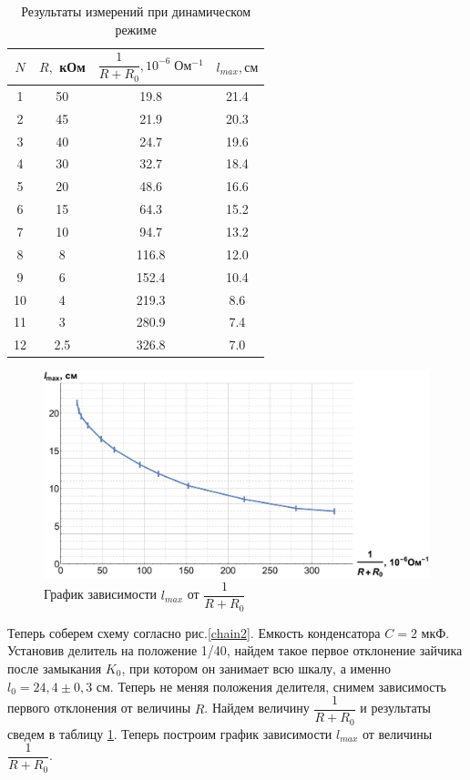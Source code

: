 \documentclass[12pt]{kiarticle} %
\begin{document}
 \begin{table}[h]
	\centering
	\caption{Результаты измерений при динамическом режиме}
	\begin{tabular}{|c|c|c|c|}
		\hline
	$ N $ & $ R, $ кОм & $ \dfrac{1}{R+R_0}, 10^{-6}\; Ом^{-1} $& $ l_{max}, см $ \\
		\hline
		1 & 50 & 19.8 & 21.4 \\
		2 & 45 & 21.9 & 20.3 \\
		3 & 40 & 24.7 & 19.6 \\
		4 & 30 & 32.7 & 18.4 \\
		5 & 20 & 48.6 & 16.6 \\
		6 & 15 & 64.3 & 15.2 \\
		7 & 10 & 94.7 & 13.2 \\
		8 & 8 & 116.8 & 12.0 \\
		9 & 6 & 152.4 & 10.4 \\
		10 & 4 & 219.3 & 8.6 \\
		11 & 3 & 280.9 & 7.4 \\
		12 & 2.5 & 326.8 & 7.0  \\
		\hline
	\end{tabular}%
	\label{resL}%
\end{table}%

	 \begin{figure}[h!]
	\includegraphics[scale=0.5]{L.pdf}
	\caption{График зависимости $ l_{max} $ от $ \dfrac{1}{R + R_0} $}
\end{figure}

Теперь соберем схему согласно рис.\ref{chain2}. Емкость конденсатора $ C = 2  $ мкФ. Установив делитель на положение 1/40, найдем такое первое отклонение зайчика после замыкания $ K_0 $, при котором он занимает всю шкалу, а именно $ l_{0} =  24,4 \pm 0,3 $ см. Теперь не меняя положения делителя, снимем зависимость первого отклонения от величины $ R $.  Найдем величину $ \dfrac{1}{R + R_0} $ и результаты сведем в таблицу \ref{resL}. Теперь построим график зависимости $ l_{max} $ от величины $ \dfrac{1}{R + R_0} $.  
\end{document}
